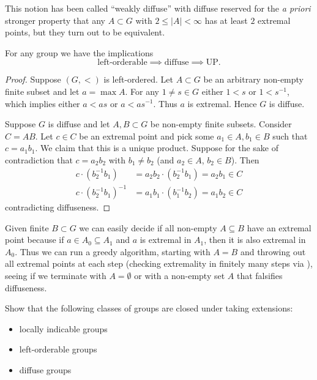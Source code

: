 \begin{remark}
    This notion has been called ``weakly diffuse'' with diffuse reserved for the \emph{a priori} stronger property that any $A \subset G$ with $2 \leq |A| < \infty$ has at least $2$ extremal points, but they turn out to be equivalent.
\end{remark}

\begin{proposition}
    For any group we have the implications \[
        \text{left-orderable} \implies \text{diffuse} \implies \text{UP}.
    \]
\end{proposition}

\begin{proof}
    Suppose $(G, <)$ is left-ordered.
    Let $A \subset G$ be an arbitrary non-empty finite subset and let $a = \max A$.
    For any $1 \neq s \in G$ either $1 < s$ or $1 < s^{-1}$, which implies either $a < a s$ or $a < a s^{-1}$.
    Thus $a$ is extremal.
    Hence $G$ is diffuse.

    Suppose $G$ is diffuse and let $A, B \subset G$ be non-empty finite subsets.
    Consider $C = AB$.
    Let $c \in C$ be an extremal point and pick some $a_1 \in A, b_1 \in B$ such that $c = a_1 b_1$.
    We claim that this is a unique product.
    Suppose for the sake of contradiction that $c = a_2 b_2$ with $b_1 \neq b_2$ (and $a_2 \in A$, $b_2 \in B$).
    Then
    \begin{align*}
        c \cdot (b_2^{-1} b_1) &= a_2 b_2 \cdot (b_2^{-1} b_1) = a_2 b_1 \in C \\
        c \cdot (b_2^{-1} b_1)^{-1} &= a_1 b_1 \cdot (b_1^{-1} b_2) = a_1 b_2 \in C
    \end{align*}
    contradicting diffuseness.
\end{proof}

\begin{remark}
    Given finite $B \subset G$ we can easily decide if all non-empty $A \subseteq B$ have an extremal point because if $a \in A_0 \subseteq A_1$ and $a$ is extremal in $A_1$, then it is also extremal in $A_0$.
    Thus we can run a greedy algorithm, starting with $A = B$ and throwing out all extremal points at each step (checking extremality in finitely many steps via ), seeing if we terminate with $A = \emptyset$ or with a non-empty set $A$ that falsifies diffuseness.
\end{remark}

\begin{exercise}
    Show that the following classes of groups are closed under taking extensions:
    \begin{itemize}
        \item locally indicable groups
        \item left-orderable groups
        \item diffuse groups
    \end{itemize}
\end{exercise}


